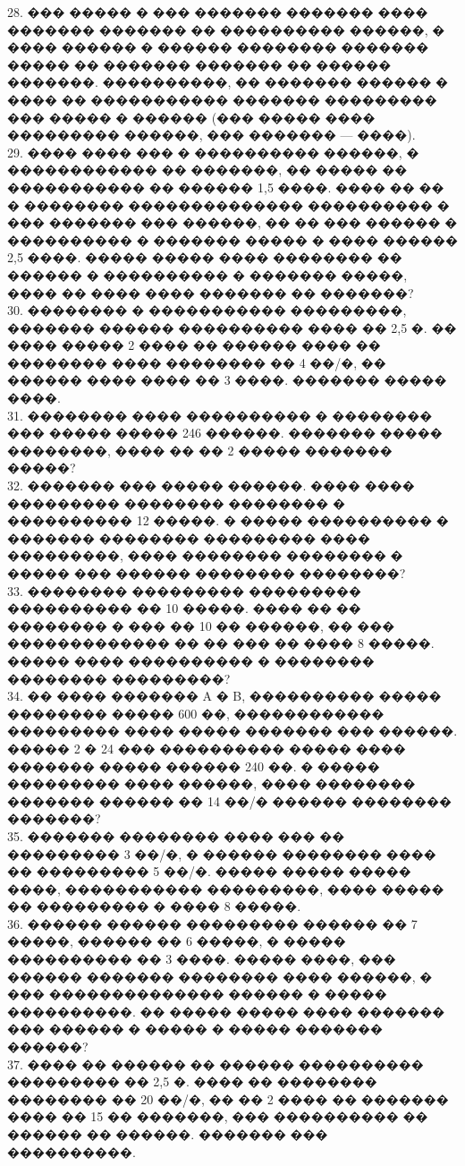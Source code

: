 \documentclass[12pt]{article}
\begin{document}
28. ��� ����� � ��� ������� ������� ���� ������� ������� �� ���������� ������, � ���� ������ � ������ �������� ������� ����� �� ������� ������� �� ������ �������. ����������, �� ������� ������ � ���� �� ����������� ������� ��������� ��� ����� � ������ (��� ����� ���� ��������� ������, ��� ������� --- ����).\\
29. ���� ���� ��� � ���������� ������, � ������������ �� �������, �� ����� �� ����������� �� ������ 1,5 ����. ���� �� �� � �������� �������������� ���������� � ��� ������� ��� ������, �� �� ��� ������ � ���������� � ������� ����� � ���� ������ 2,5 ����. ����� ����� ���� �������� �� ������ � ���������� � ������� �����, ���� �� ���� ���� ������� �� �������?\\
30. �������� � ����������� ���������, ������� ������ ���������� ���� �� 2,5 �. �� ���� ����� 2 ���� �� ������ ���� �� �������� ���� �������� �� 4 ��/�, �� ������ ���� ���� �� 3 ����. ������� ����� ����.\\
31. �������� ���� ���������� � �������� ��� ����� ����� 246 ������. ������� ����� ��������, ���� �� �� 2 ����� ������� �����?\\
32. ������� ��� ����� ������. ���� ���� ��������� �������� �������� � ���������� 12 �����. � ����� ���������� � ������� �������� ��������� ���� ���������, ���� �������� �������� � ����� ��� ������ �������� ��������?\\
33. �������� ��������� ��������� ���������� �� 10 �����. ���� �� �� �������� � ��� �� 10 �� ������, �� ��� ������������� �� �� ��� �� ���� 8 �����. ����� ���� ���������� � �������� �������� ���������?\\
34. �� ���� ������� A � B, ���������� ����� �������� ����� 600 ��, ������������ ��������� ���� ����� ������� ��� ������. ����� 2 � 24 ��� ���������� ����� ���� ������� ����� ������ 240 ��. � ����� ��������� ���� ������, ���� �������� ������� ������ �� 14 ��/� ������ �������� �������?\\
35. ������� �������� ���� ��� �� ��������� 3 ��/�, � ������ �������� ���� �� ��������� 5 ��/�. ����� ����� ����� ����, ����������� ���������, ���� ����� �� ��������� � ���� 8 �����.\\
36. ������ ������ ��������� ������ �� 7 �����, ������ �� 6 �����, � ����� ���������� �� 3 ����. ����� ����, ��� ������ ������� �������� ���� ������, � ��� �������������� ������ � ����� ����������. �� ����� ����� ���� ������� ��� ������ � ����� � ����� ������� ������?\\
37. ���� �� ������ �� ������ ���������� ��������� �� 2,5 �. ���� �� �������� �������� �� 20 ��/�, �� �� 2 ���� �� ������� ���� �� 15 �� �������, ��� ���������� �� ������ �� ������. ������� ��� ����������.\\
\end{document}
